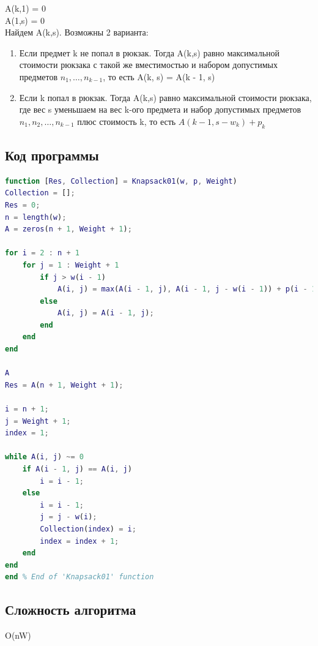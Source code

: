 \documentclass{article}
\begin{document}
A(k,1) = 0\\

A(1,s) = 0\\

Найдем A(k,s). Возможны 2 варианта:

\begin{enumerate}
	\item Если предмет k не попал в рюкзак. Тогда A(k,s) равно максимальной стоимости рюкзака с такой же вместимостью и набором допустимых предметов ${n_{1}, \ldots , n_{k - 1}}$, то есть A(k, s) = A(k - 1, s)
	\item Если k попал в рюкзак. Тогда A(k,s) равно максимальной стоимости рюкзака, где вес s уменьшаем на вес k-ого предмета и набор допустимых предметов ${n_{1}, n_{2}, \ldots , n_{k - 1}}$ плюс стоимость k, то есть $A(k - 1, s - w_{k}) + p_{k}$
\end{enumerate}
\subsection{Код программы}
\begin{lstlisting}[language={Matlab}, caption={Тест. Расстояние редактирования}, label={Script}]
function [Res, Collection] = Knapsack01(w, p, Weight)
Collection = [];
Res = 0;
n = length(w);
A = zeros(n + 1, Weight + 1);

for i = 2 : n + 1
	for j = 1 : Weight + 1
		if j > w(i - 1)
			A(i, j) = max(A(i - 1, j), A(i - 1, j - w(i - 1)) + p(i - 1));
		else
			A(i, j) = A(i - 1, j);
		end
	end
end

A
Res = A(n + 1, Weight + 1);

i = n + 1;
j = Weight + 1;
index = 1;

while A(i, j) ~= 0
	if A(i - 1, j) == A(i, j)
		i = i - 1;
	else
		i = i - 1;
		j = j - w(i);
		Collection(index) = i;
		index = index + 1;
	end
end
end % End of 'Knapsack01' function
\end{lstlisting}
\subsection{Сложность алгоритма}
O(nW)
\end{document}

